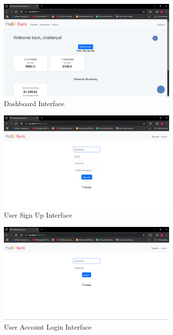 \begin{figure}[h]
    \centering
    \includegraphics[width=0.8\textwidth]{flask_assets/dashboard.jpg}
    \caption{Dashboard Interface}
\end{figure}

\begin{figure}[h]
    \centering
    \includegraphics[width=0.8\textwidth]{flask_assets/register.jpg}
    \caption{User Sign Up Interface}
\end{figure}

\begin{figure}[h]
    \centering
    \includegraphics[width=0.8\textwidth]{flask_assets/login.jpg}
    \caption{User Account Login Interface}
\end{figure}

